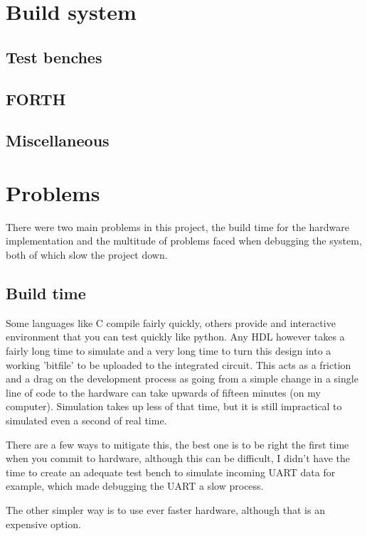\documentclass	[a4paper, 10pt]	{article}
\begin{document}
  \section{Build system}
    \subsection{Test benches}
    \subsection{FORTH}
    \subsection{Miscellaneous}

  \section{Problems}

    There were two main problems in this project, the build time for the hardware
    implementation and the multitude of problems faced when debugging the system,
    both of which slow the project down.

    \subsection{Build time}

    Some languages like C compile fairly quickly, others provide and interactive
    environment that you can test quickly like python. Any HDL however takes
    a fairly long time to simulate and a very long time to turn this design into
    a working 'bitfile' to be uploaded to the integrated circuit. This acts as
    a friction and a drag on the development process as going from a simple change
    in a single line of code to the hardware can take upwards of fifteen minutes
    (on my computer). Simulation takes up less of that time, but it is still
    impractical to simulated even a second of real time. 

    There are a few ways
    to mitigate this, the best one is to be right the first time when you commit
    to hardware, although this can be difficult, I didn't have the time to create
    an adequate test bench to simulate incoming UART data for example, which made
    debugging the UART a slow process.

    The other simpler way is to use ever faster hardware, although that is an
    expensive option.
\end{document}
